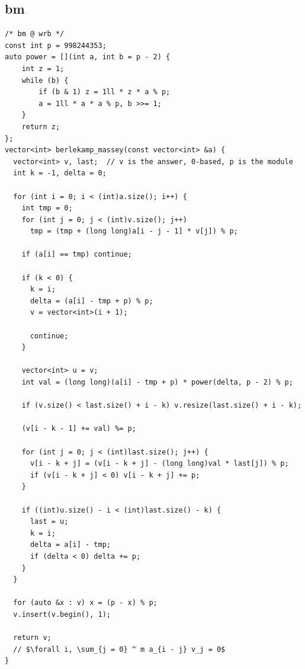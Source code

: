 \documentclass[UTF8, a4paper, titlepage, twoside]{ctexart}
\begin{document}
\subsection{ bm }
\begin{lstlisting}[style=cpp]
/* bm @ wrb */
const int p = 998244353;
auto power = [](int a, int b = p - 2) {
    int z = 1;
    while (b) {
        if (b & 1) z = 1ll * z * a % p;
        a = 1ll * a * a % p, b >>= 1;
    }
    return z;
};
vector<int> berlekamp_massey(const vector<int> &a) {
  vector<int> v, last;  // v is the answer, 0-based, p is the module
  int k = -1, delta = 0;

  for (int i = 0; i < (int)a.size(); i++) {
    int tmp = 0;
    for (int j = 0; j < (int)v.size(); j++)
      tmp = (tmp + (long long)a[i - j - 1] * v[j]) % p;

    if (a[i] == tmp) continue;

    if (k < 0) {
      k = i;
      delta = (a[i] - tmp + p) % p;
      v = vector<int>(i + 1);

      continue;
    }

    vector<int> u = v;
    int val = (long long)(a[i] - tmp + p) * power(delta, p - 2) % p;

    if (v.size() < last.size() + i - k) v.resize(last.size() + i - k);

    (v[i - k - 1] += val) %= p;

    for (int j = 0; j < (int)last.size(); j++) {
      v[i - k + j] = (v[i - k + j] - (long long)val * last[j]) % p;
      if (v[i - k + j] < 0) v[i - k + j] += p;
    }

    if ((int)u.size() - i < (int)last.size() - k) {
      last = u;
      k = i;
      delta = a[i] - tmp;
      if (delta < 0) delta += p;
    }
  }

  for (auto &x : v) x = (p - x) % p;
  v.insert(v.begin(), 1);

  return v;
  // $\forall i, \sum_{j = 0} ^ m a_{i - j} v_j = 0$
}
\end{lstlisting}

\newpage
\end{document}
